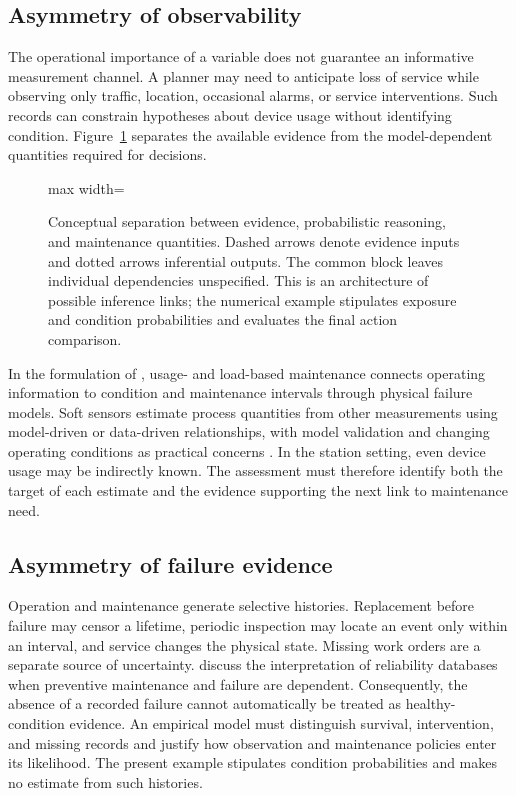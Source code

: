\documentclass[symmetry,article,submit,pdftex,oneauthor]{Definitions/mdpi}
\begin{document}
\subsection{Asymmetry of observability}

The operational importance of a variable does not guarantee an informative measurement channel. A planner may need to anticipate loss of service while observing only traffic, location, occasional alarms, or service interventions. Such records can constrain hypotheses about device usage without identifying condition. Figure~\ref{fig:asymmetry-observability} separates the available evidence from the model-dependent quantities required for decisions.

\begin{figure}[t]
\centering
\begin{adjustbox}{max width=\linewidth}

\end{adjustbox}
\caption{Conceptual separation between evidence, probabilistic reasoning, and maintenance quantities. Dashed arrows denote evidence inputs and dotted arrows inferential outputs. The common block leaves individual dependencies unspecified. This is an architecture of possible inference links; the numerical example stipulates exposure and condition probabilities and evaluates the final action comparison.}
\label{fig:asymmetry-observability}
\end{figure}

In the formulation of \citet{Tinga2010UsageLoad}, usage- and load-based maintenance connects operating information to condition and maintenance intervals through physical failure models. Soft sensors estimate process quantities from other measurements using model-driven or data-driven relationships, with model validation and changing operating conditions as practical concerns \citep{Kadlec2009SoftSensors}. In the station setting, even device usage may be indirectly known. The assessment must therefore identify both the target of each estimate and the evidence supporting the next link to maintenance need.

\subsection{Asymmetry of failure evidence}

Operation and maintenance generate selective histories. Replacement before failure may censor a lifetime, periodic inspection may locate an event only within an interval, and service changes the physical state. Missing work orders are a separate source of uncertainty. \citet{CookeBedford2002ReliabilityData} discuss the interpretation of reliability databases when preventive maintenance and failure are dependent. Consequently, the absence of a recorded failure cannot automatically be treated as healthy-condition evidence. An empirical model must distinguish survival, intervention, and missing records and justify how observation and maintenance policies enter its likelihood. The present example stipulates condition probabilities and makes no estimate from such histories.
\end{document}

